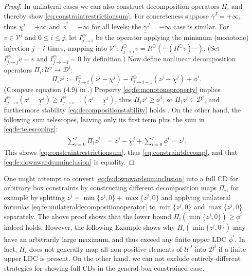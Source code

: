 \documentclass[review,hidelinks,onefignum,onetabnum]{siamart220329}
\newcommand{\minR}{R^{\bm{\ominus}}}
\begin{document}
\begin{proof}
In unilateral cases we can also construct decomposition operators $\Pi_i$ and thereby show \eqref{eq:constraintrestrictionsum}.  For concreteness suppose $\overline{\gamma}^J=+\infty$, thus $\overline{\chi}^j=+\infty$ and $\overline{\phi}^i = +\infty$ for all levels; the $\underline{\gamma}^J=-\infty$ case is similar.  For $v\in \mathcal{V}^j$ and $0\le i \le j$, let $I_{j\to i}^\ominus$ be the operator applying the minimum (monotone) injection $j-i$ times, mapping into $\mathcal{V}^i$: $I_{j\to i}^\ominus v = \minR(\cdots(\minR v)\cdots) $.  (Set $I_{j\to j}^\ominus v = v$ and $I_{j\to -1}^\ominus=0$ by definition.)  Now define nonlinear decomposition operators $\Pi_i:\mathcal{U}^j \to \mathcal{D}^i$:
\begin{equation}
\Pi_i z^j \coloneqq I_{j\to i}^\ominus(z^j - \underline{\chi}^j) - I_{j\to i-1}^\ominus(z^j - \underline{\chi}^j) + \underline{\phi}^i.  \label{eq:fe:unilateraldecompositionoperator}
\end{equation}
(Compare equation (4.9) in \cite{GraeserKornhuber2009}.)  Property \eqref{eq:fe:monotoneproperty} implies $I_{j\to i}^\ominus(z^j - \underline{\chi}^j) \ge I_{j\to i-1}^\ominus(z^j - \underline{\chi}^j)$, thus $\Pi_i z^j \ge \underline{\phi}^i$, so $\Pi_i z^j \in \mathcal{D}^i$, and furthermore stability \eqref{eq:decompositionstability} holds \cite[Theorem 4.2]{GraeserKornhuber2009}.  On the other hand, the following sum telescopes, leaving only its first term plus the sum in \eqref{eq:fe:telescoping}:
\begin{align*}
\sum_{i=0}^j \Pi_i z^j &= z^j - \underline{\chi}^j + \sum_{i=0}^j \underline{\phi}^i = z^j.
\end{align*}
This shows \eqref{eq:constraintrestrictionsum}, thus \eqref{eq:constraintdecomp}, and that \eqref{eq:fe:downwardsuminclusion} is equality.
\end{proof}

One might attempt to convert \eqref{eq:fe:downwardsuminclusion} into a full CD for arbitrary box constraints by constructing different decomposition maps $\Pi_i$, for example by splitting $z^j = \min\{z^j,0\} + \max\{z^j,0\}$ and applying unilateral formulas \eqref{eq:fe:unilateraldecompositionoperator} to $\min\{z^j,0\}$ and $\max\{z^j,0\}$ separately.  The above proof shows that the lower bound $\Pi_i (\min\{z^j,0\}) \ge \underline{\phi}^i$ indeed holds.  However, the following Example shows why $\Pi_i(\min\{z^j,0\})$ may have an arbitrarily large maximum, and thus exceed any finite upper LDC $\overline{\phi}^i$.  In fact, $\Pi_i$ does not generally map all non-positive elements of $\mathcal{U}^J$ into $\mathcal{D}^i$ if a finite upper LDC is present.  On the other hand, we can not exclude entirely-different strategies for showing full CDs in the general box-constrained case.
\end{document}
